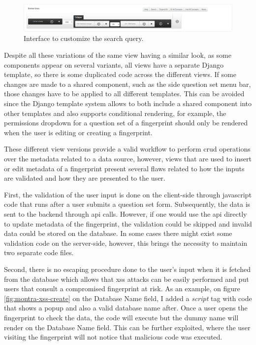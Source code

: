 \begin{figure}[H]
    \center
    \includegraphics[width=\textwidth]{boolean-query}
    \caption{Interface to customize the search query.}
    \label{fig:boolean-query}
\end{figure}


Despite all these variations of the same view having a similar look, as some components appear on several variants, all views have a separate Django template, so there is some duplicated code across the different views.
If some changes are made to a shared component, such as the side question set menu bar, those changes have to be applied to all different templates.
This can be avoided since the Django template system allows to both include a shared component into other templates and also supports conditional rendering, for example, the permissions dropdown for a question set of a fingerprint should only be rendered when the user is editing or creating a fingerprint.


These different view versions provide a valid workflow to perform \gls{crud} operations over the metadata related to a data source, however, views that are used to insert or edit metadata of a fingerprint present several flaws related to how the inputs are validated and how they are presented to the user.

First, the validation of the user input is done on the client-side through javascript code that runs after a user submits a question set form.
Subsequently, the data is sent to the backend through \gls{api} calls.
However, if one would use the \gls{api} directly to update metadata of the fingerprint, the validation could be skipped and invalid data could be stored on the database.
In some cases there might exist some validation code on the server-side, however, this brings the necessity to maintain two separate code files.

Second, there is no escaping procedure done to the user's input when it is fetched from the database which allows that \gls{xss} attacks can be easily performed and put users that consult a compromised fingerprint at risk.
As an example, on figure \ref{fig:montra-xss-create} on the Database Name field, I added a \textit{script} tag with code that shows a popup and also a valid database name after.
Once a user opens the fingerprint to check the data, the code will execute but the dummy name will render on the Database Name field.
This can be further exploited, where the user visiting the fingerprint will not notice that malicious code was executed.

